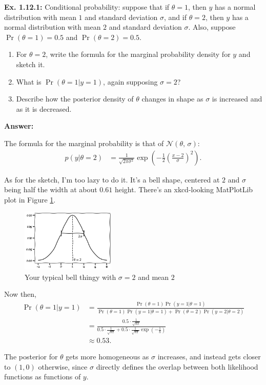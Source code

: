 \documentclass{article}
\newcommand\oname\operatorname
\begin{document}

\textbf{Ex. 1.12.1: }Conditional probability: suppose that if $\theta=1$, then $y$ has a normal distribution with mean $1$ and standard deviation $\sigma$, and if $\theta=2$, then $y$ has a normal distribution with mean $2$ and standard deviation $\sigma$. Also, suppose $\oname{Pr}(\theta=1)=0.5$ and $\oname{Pr}(\theta=2)=0.5$.

\begin{enumerate}[label=\alph*]
	\item For $\theta=2$, write the formula for the marginal probability density for $y$ and sketch it.
	\item What is $\oname{Pr}(\theta=1|y=1)$, again supposing $\sigma=2$?
	\item Describe how the posterior density of $\theta$ changes in shape as $\sigma$ is increased and as it is decreased.
\end{enumerate}

\textbf{Answer:}

The formula for the marginal probability is that of $\mathcal N(\theta,\,\sigma)$:
\begin{align*}
	p(y|\theta=2)&=\frac1{\sqrt{2\pi\sigma^2}}\exp\left(-\frac12\left(\frac{x-2}\sigma\right)^2\right).
\end{align*}

As for the sketch, I'm too lazy to do it. It's a bell shape, centered at $2$ and $\sigma$ being half the width at about $0.61$ height. There's an xkcd-looking MatPlotLib plot in Figure \ref{fig:1.12.1}.
\begin{figure}[h]
	\centering
	\includegraphics[width=0.4\textwidth]{Numerical/1.12.1}
	\caption{Your typical bell thingy with $\sigma=2$ and mean $2$}
	\label{fig:1.12.1}
\end{figure}

Now then,
\begin{align*}
	\oname{Pr}(\theta=1|y=1)&=\frac{\oname{Pr}(\theta=1)\oname{Pr}(y=1|\theta=1)}{\oname{Pr}(\theta=1)\oname{Pr}(y=1|\theta=1)+\oname{Pr}(\theta=2)\oname{Pr}(y=2|\theta=2)}\\
	&=\frac{0.5\cdot\frac1{\sqrt{8\pi}}}{0.5\cdot\frac1{\sqrt{8\pi}}+0.5\cdot\frac1{\sqrt{8\pi}}\exp\left(-\frac18\right)}\\
	&\approx0.53.
\end{align*}

The posterior for $\theta$ gets more homogeneous as $\sigma$ increases, and instead gets closer to $(1, 0)$ otherwise, since $\sigma$ directly defines the overlap between both likelihood functions as functions of $y$.
\end{document}
